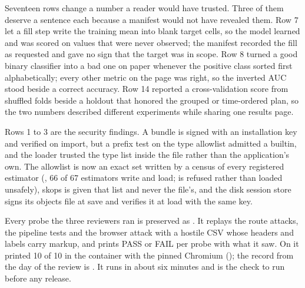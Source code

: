 Seventeen rows change a number a reader would have trusted. Three of them deserve a sentence each because a manifest would not have revealed them. Row 7 let a fill step write the training mean into blank target cells, so the model learned and was scored on values that were never observed; the manifest recorded the fill as requested and gave no sign that the target was in scope. Row 8 turned a good binary classifier into a bad one on paper whenever the positive class sorted first alphabetically; every other metric on the page was right, so the inverted AUC stood beside a correct accuracy. Row 14 reported a cross-validation score from shuffled folds beside a holdout that honored the grouped or time-ordered plan, so the two numbers described different experiments while sharing one results page.

Rows 1 to 3 are the security findings. A bundle is signed with an installation key and verified on import, but a prefix test on the type allowlist admitted a builtin, and the loader trusted the type list inside the file rather than the application's own. The allowlist is now an exact set written by a census of every registered estimator (, 66 of 67 estimators write and load;  is refused rather than loaded unsafely), skops is given that list and never the file's, and the disk session store signs its objects file at save and verifies it at load with the same key.

Every probe the three reviewers ran is preserved as . It replays the route attacks, the pipeline tests and the browser attack with a hostile CSV whose headers and labels carry markup, and prints PASS or FAIL per probe with what it saw. On  it printed 10 of 10 in the container with the pinned Chromium (); the record from the day of the review is . It runs in about six minutes and is the check to run before any release.

